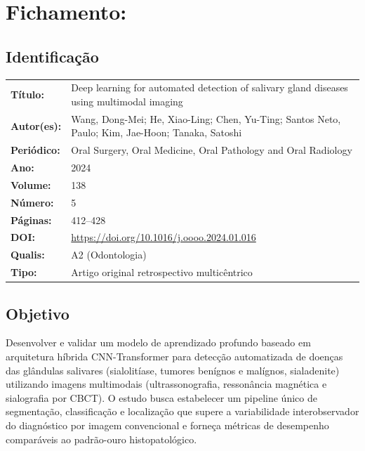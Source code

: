 \section{Fichamento: }

\subsection{Identificação}
\begin{tabular}{ll}
\textbf{Título:} & Deep learning for automated detection of salivary gland
diseases using multimodal imaging \\
\textbf{Autor(es):} & Wang, Dong-Mei; He, Xiao-Ling; Chen, Yu-Ting;
Santos Neto, Paulo; Kim, Jae-Hoon; Tanaka, Satoshi \\
\textbf{Periódico:} & Oral Surgery, Oral Medicine, Oral Pathology and Oral Radiology \\
\textbf{Ano:} & 2024 \\
\textbf{Volume:} & 138 \\
\textbf{Número:} & 5 \\
\textbf{Páginas:} & 412--428 \\
\textbf{DOI:} & \url{https://doi.org/10.1016/j.oooo.2024.01.016} \\
\textbf{Qualis:} & A2 (Odontologia) \\
\textbf{Tipo:} & Artigo original retrospectivo multicêntrico \\
\end{tabular}

\subsection{Objetivo}
Desenvolver e validar um modelo de aprendizado profundo baseado em
arquitetura híbrida CNN-Transformer para detecção automatizada de
doenças das glândulas salivares (sialolitíase, tumores benígnos e
malígnos, sialadenite) utilizando imagens multimodais (ultrassonografia,
ressonância magnética e sialografia por CBCT). O estudo busca estabelecer
um pipeline único de segmentação, classificação e localização que
supere a variabilidade interobservador do diagnóstico por imagem
convencional e forneça métricas de desempenho comparáveis ao padrão-ouro
histopatológico.

